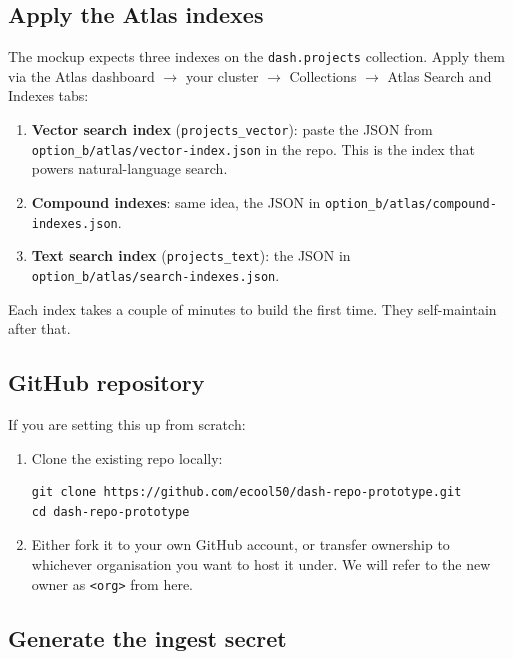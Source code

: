 \documentclass[11pt,a4paper]{article}
\begin{document}
\subsection{Apply the Atlas indexes}

The mockup expects three indexes on the \texttt{dash.projects} collection. Apply them via the Atlas dashboard \(\rightarrow\) your cluster \(\rightarrow\) Collections \(\rightarrow\) Atlas Search and Indexes tabs:

\begin{enumerate}[leftmargin=1.5em,itemsep=2pt]
  \item \textbf{Vector search index} (\texttt{projects\_vector}): paste the JSON from \texttt{option\_b/atlas/vector-index.json} in the repo. This is the index that powers natural-language search.
  \item \textbf{Compound indexes}: same idea, the JSON in \texttt{option\_b/atlas/compound-indexes.json}.
  \item \textbf{Text search index} (\texttt{projects\_text}): the JSON in \texttt{option\_b/atlas/search-indexes.json}.
\end{enumerate}

Each index takes a couple of minutes to build the first time. They self-maintain after that.

\subsection{GitHub repository}

If you are setting this up from scratch:

\begin{enumerate}[leftmargin=1.5em,itemsep=2pt]
  \item Clone the existing repo locally:
\begin{lstlisting}[style=shell]
git clone https://github.com/ecool50/dash-repo-prototype.git
cd dash-repo-prototype
\end{lstlisting}
  \item Either fork it to your own GitHub account, or transfer ownership to whichever organisation you want to host it under. We will refer to the new owner as \texttt{<org>} from here.
\end{enumerate}

\subsection{Generate the ingest secret}
\end{document}

